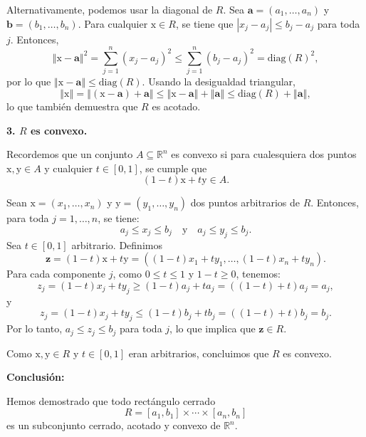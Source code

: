 \documentclass[12pt]{article}
\newcommand{\abs}[1]{\left\vert#1\right\vert}
\newcommand{\norm}[1]{\left\Vert#1\right\Vert}
\newcommand{\diag}{\mathrm{diag}}
\newcommand{\R}{\mathbb R}
\newcommand{\x}{\mathrm x}
\newcommand{\y}{\mathrm y}
\begin{document}
\begin{enumerate}
Alternativamente, podemos usar la diagonal de $R$. Sea $\mathbf{a} = (a_1, \ldots, a_n)$ y $\mathbf{b} = (b_1, \ldots, b_n)$. Para cualquier $\x \in R$, se tiene que $\abs{x_j - a_j} \leq b_j - a_j$ para toda $j$. Entonces,
\[
\norm{\x - \mathbf{a}}^2 = \sum_{j=1}^{n} (x_j - a_j)^2 \leq \sum_{j=1}^{n} (b_j - a_j)^2 = \diag(R)^2,
\]
por lo que $\norm{\x - \mathbf{a}} \leq \diag(R)$. Usando la desigualdad triangular,
\[
\norm{\x} = \norm{(\x - \mathbf{a}) + \mathbf{a}} \leq \norm{\x - \mathbf{a}} + \norm{\mathbf{a}} \leq \diag(R) + \norm{\mathbf{a}},
\]
lo que también demuestra que $R$ es acotado.

\textbf{3. $R$ es convexo.}

Recordemos que un conjunto $A \subseteq \R^n$ es convexo si para cualesquiera dos puntos $\x, \y \in A$ y cualquier $t \in [0,1]$, se cumple que
\[
(1-t)\x + t\y \in A.
\]

Sean $\x = (x_1, \ldots, x_n)$ y $\y = (y_1, \ldots, y_n)$ dos puntos arbitrarios de $R$. Entonces, para toda $j = 1, \ldots, n$, se tiene:
\[
a_j \leq x_j \leq b_j \quad \text{y} \quad a_j \leq y_j \leq b_j.
\]
Sea $t \in [0,1]$ arbitrario. Definimos
\[
\mathbf{z} = (1-t)\x + t\y = ((1-t)x_1 + ty_1, \ldots, (1-t)x_n + ty_n).
\]
Para cada componente $j$, como $0 \leq t \leq 1$ y $1-t \geq 0$, tenemos:
\[
z_j = (1-t)x_j + ty_j \geq (1-t)a_j + ta_j = ((1-t) + t)a_j = a_j,
\]
y
\[
z_j = (1-t)x_j + ty_j \leq (1-t)b_j + tb_j = ((1-t) + t)b_j = b_j.
\]
Por lo tanto, $a_j \leq z_j \leq b_j$ para toda $j$, lo que implica que $\mathbf{z} \in R$.

Como $\x, \y \in R$ y $t \in [0,1]$ eran arbitrarios, concluimos que $R$ es convexo.

\textbf{Conclusión:}

Hemos demostrado que todo rectángulo cerrado
\[
R = [a_1,b_1]\times \cdots\times [a_n,b_n]
\]
es un subconjunto cerrado, acotado y convexo de $\R^n$.

\end{enumerate}
\end{document}
